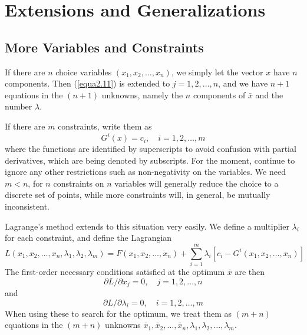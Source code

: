 \chapter{Extensions and Generalizations}

\section*{More Variables and Constraints}

If there are $n$ choice variables $(x_1, x_2, \dots, x_n)$, we simply let the vector $x$ have $n$ components. Then (\ref{equa2.11}) is extended to $j=1,2,\dots,n$, and we have $n+1$ equations in the $(n+1)$ unknowns, namely the $n$ components of $\bar{x}$ and the number $\lambda$.

If there are $m$ constraints, write them as
\begin{equation*}
 G^i(x) = c_i, \quad i = 1,2,\dots, m
\end{equation*}
where the functions are identified by superscripts to avoid confusion with partial derivatives, which are being denoted by subscripts. For the moment, continue to ignore any other restrictions such as non-negativity on the variables. We need $m<n$, for $n$ constraints on $n$ variables will generally reduce the choice to a discrete set of points, while more constraints will, in general, be mutually inconsistent.

Lagrange's method extends to this situation very easily. We define a multiplier $\lambda_i$ for each constraint, and define the Lagrangian
\begin{equation} \label{equa3.1}
L(x_1, x_2, \dots, x_n, \lambda_1, \lambda_2, \lambda_m) = F(x_1, x_2, \dots, x_n ) + \sum_{i=1}^{m} \lambda_i [c_i - G^i(x_1, x_2, \dots, x_n)]
\end{equation}
The first-order necessary conditions satisfied at the optimum $\bar{x}$ are then
\begin{equation} \label{equa3.2}
\partial L / \partial x_j = 0, \quad j =1,2,\dots,n
\end{equation}
and
\begin{equation} \label{equa3.3}
\partial L / \partial \lambda_i = 0, \quad i =1,2,\dots,m
\end{equation}
When using these to search for the optimum, we treat them as $(m+n)$ equations in the $(m+n)$ unknowns $\bar{x}_1, \bar{x}_2, \dots, \bar{x}_n, \lambda_1, \lambda_2, \dots, \lambda_m$.

